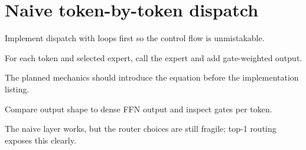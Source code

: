 \section{Naive token-by-token dispatch}
\label{sec:ch03-naive-token-by-token-dispatch}

Implement dispatch with loops first so the control flow is unmistakable.



For each token and selected expert, call the expert and add gate-weighted output.



The planned mechanics should introduce the equation before the implementation listing.





\begin{checkpointbox}
Compare output shape to dense FFN output and inspect gates per token.
\end{checkpointbox}

The naive layer works, but the router choices are still fragile; top-1 routing exposes this clearly.
